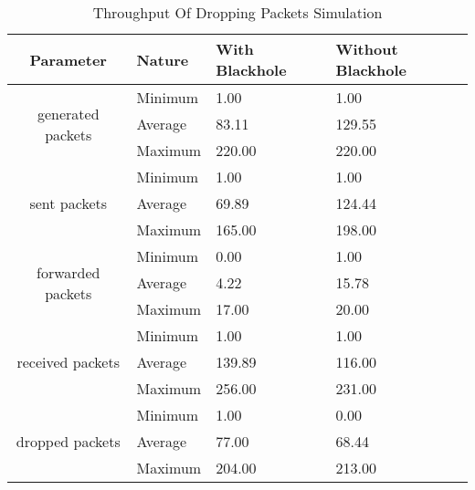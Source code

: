 \begin{table}[]
	\begin{tabular}{|c|l|l|l|}
		\hline
		\textbf{Parameter}                 & \textbf{Nature} & \textbf{With Blackhole} & \textbf{Without Blackhole} \\ \hline
		\multirow{3}{*}{generated packets} & Minimum         & 1.00                    & 1.00                       \\ \cline{2-4}
		& Average         & 83.11                   & 129.55                     \\ \cline{2-4}
		& Maximum         & 220.00                  & 220.00                     \\ \hline
		\multirow{3}{*}{sent packets}      & Minimum         & 1.00                    & 1.00                       \\ \cline{2-4}
		& Average         & 69.89                   & 124.44                     \\ \cline{2-4}
		& Maximum         & 165.00                  & 198.00                     \\ \hline
		\multirow{3}{*}{forwarded packets} & Minimum         & 0.00                    & 1.00                       \\ \cline{2-4}
		& Average         & 4.22                    & 15.78                      \\ \cline{2-4}
		& Maximum         & 17.00                   & 20.00                      \\ \hline
		\multirow{3}{*}{received packets}  & Minimum         & 1.00                    & 1.00                       \\ \cline{2-4}
		& Average         & 139.89                  & 116.00                     \\ \cline{2-4}
		& Maximum         & 256.00                  & 231.00                     \\ \hline
		\multirow{3}{*}{dropped packets}   & Minimum         & 1.00                    & 0.00                       \\ \cline{2-4}
		& Average         & 77.00                   & 68.44                      \\ \cline{2-4}
		& Maximum         & 204.00                  & 213.00                     \\ \hline
	\end{tabular}
	\caption{Throughput Of Dropping Packets Simulation}
	\label{tab:through}
\end{table}

